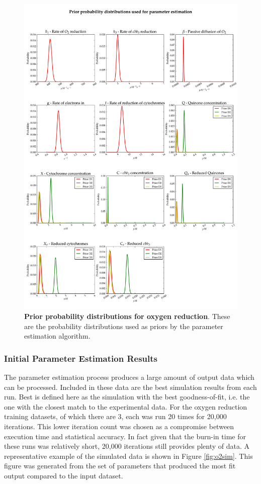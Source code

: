 \begin{figure}[p]
 \centering
 \includegraphics[width=15cm, trim=0cm 0cm 0cm 0cm]{./05-oxygenreduction/data/priors1.pdf}
 \caption[Prior probability distributions for oxygen reduction]{{\bf Prior probability distributions for oxygen reduction}. These are the probability distributions used as priors by the parameter estimation algorithm.
 \label{fig:oxypriors}}
\end{figure}
\afterpage{\clearpage}

\subsubsection{Initial Parameter Estimation Results}
The parameter estimation process produces a large amount of output data which can be processed. Included in these data are the best simulation results from each run. Best is defined here as the simulation with the best goodness-of-fit, i.e. the one with the closest match to the experimental data. For the oxygen reduction training datasets, of which there are 3, each was run 20 times for 20,000 iterations. This lower iteration count was chosen as a compromise between execution time and statistical accuracy. In fact given that the burn-in time for these runs was relatively short, 20,000 iterations still provides plenty of data. A representative example of the simulated data is shown in Figure \ref{fig:o2sim}. This figure was generated from the set of parameters that produced the most fit output compared to the input dataset.

